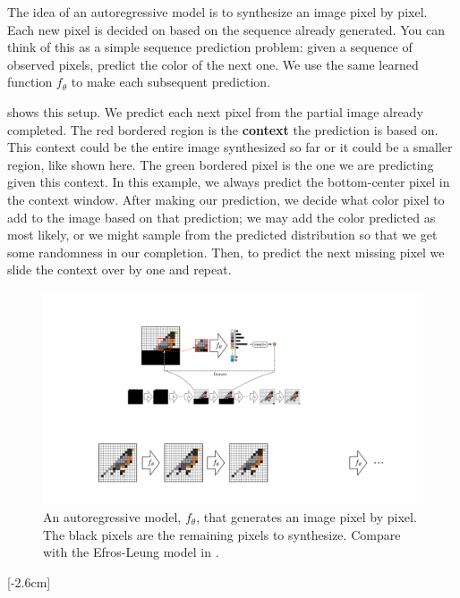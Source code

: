 The idea of an autoregressive model is to synthesize an image pixel by pixel. Each new pixel is decided on based on the sequence already generated. 
You can think of this as a simple sequence prediction problem: given a sequence of observed pixels, predict the color of the next one. We use the same learned function $f_{\theta}$ to make each subsequent prediction. 

\Fig{\ref{fig:generative_models:autoregressive_prediction_schematic}} shows this setup. We predict each next pixel from the partial image already completed. The red bordered region is the \textbf{context} the prediction is based on. This context could be the entire image synthesized so far or it could be a smaller region, like shown here. The green bordered pixel is the one we are predicting given this context. In this example, we always predict the bottom-center pixel in the context window. After making our prediction, we decide what color pixel to add to the image based on that prediction; we may add the color predicted as most likely, or we might sample from the predicted distribution so that we get some randomness in our completion. Then, to predict the next missing pixel we slide the context over by one and repeat.

\begin{figure}[t]
    \centerline{
    \includegraphics[width=1.0\linewidth]{./figures/generative_models/autoregressive_prediction_schematic.pdf}
    }
    \caption{An autoregressive model, $f_{\theta}$, that generates an image pixel by pixel. The black pixels are the remaining pixels to synthesize. Compare with the Efros-Leung model in \fig{\ref{fig:sampling_efros_leung}}.}
    \label{fig:generative_models:autoregressive_prediction_schematic}
\end{figure}
[-2.6cm]

